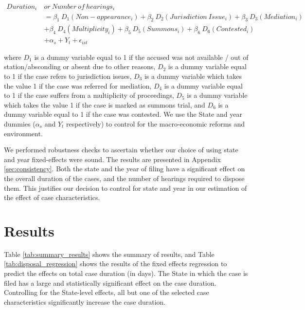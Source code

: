 \documentclass[12pt,a4paper]{article}
\begin{document}
\begin{equation}\label{eq:fe1}
\begin{split}
Duration_i \ & or \ Number \ of \ hearings_i \\
& = \beta_1 \ D_1(Non-appearance_i) + \beta_2 \ D_2(Jurisdiction \ Issue_i) + \beta_3 \ D_3(Mediation_i) \\
& + \beta_4 \ D_4(Multiplicity_i) + \beta_5 \ D_5(Summons_i) + \beta_6 \ D_6(Contested_i) \\
& + \alpha_s + Y_t + \epsilon_{ist}
\end{split}
\end{equation}

where $D_1$ is a dummy variable equal to 1 if the accused was not available / out of station/absconding or absent due to other reasons, $D_2$ is a dummy variable equal to 1 if the case refers to jurisdiction issues, $D_3$ is a dummy variable which takes the value 1 if the case was referred for mediation, $D_4$ is a dummy variable equal to 1 if the case suffers from a multiplicity of proceedings, $D_5$ is a dummy variable which takes the value 1 if the case is marked as summons trial, and $D_6$ is a dummy variable equal to 1 if the case was contested. We use the State and year dummies ($\alpha_s$ and $Y_t$ respectively) to control for the macro-economic reforms and environment.

We performed robustness checks to ascertain whether our choice of using state and year fixed-effects were sound. The results are presented in Appendix \ref{sec:consistency}. Both the state and the year of filing have a significant effect on the overall duration of the cases, and the number of hearings required to dispose them. This justifies our decision to control for state and year in our estimation of the effect of case characteristics.

\section{Results}
\label{sec:results}
Table \ref{tab:summary_results} shows the summary of results, and Table \ref{tab:disposal_regression} shows the results of the fixed effects regression to predict the effects on total case duration (in days). The State in which the case is filed has a large and statistically significant effect on the case duration. Controlling for the State-level effects, all but one of the selected case characteristics significantly increase the case duration.
\end{document}
